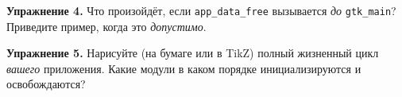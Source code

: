 \begin{exercisebox}
\textbf{Упражнение 4.} Что произойдёт, если \texttt{app\_data\_free}
вызывается \emph{до} \texttt{gtk\_main}? Приведите пример,
когда это \emph{допустимо}.
\end{exercisebox}

\begin{exercisebox}
\textbf{Упражнение 5.} Нарисуйте (на бумаге или в TikZ) полный
жизненный цикл \emph{вашего} приложения. Какие модули в каком
порядке инициализируются и освобождаются?
\end{exercisebox}


